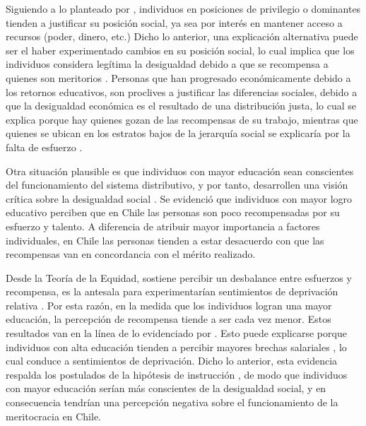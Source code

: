 \documentclass[12pt]{article}
\begin{document}
Siguiendo a lo planteado por \cite{Duru-bellat2012}, individuos en posiciones de privilegio o dominantes tienden a justificar su posición social, ya sea por interés en mantener acceso a recursos (poder, dinero, etc.) Dicho lo anterior, una explicación alternativa puede ser el haber experimentado cambios en su posición social, lo cual implica que los individuos considera legítima la desigualdad debido a que se recompensa a quienes son meritorios \citep{Day2017}. Personas que han progresado económicamente  debido  a los retornos educativos, son proclives a justificar las diferencias sociales, debido a que la desigualdad económica es el resultado de una distribución justa, lo cual se explica porque hay quienes gozan de las recompensas de su trabajo, mientras que quienes se ubican en los estratos bajos de la jerarquía social se explicaría por la falta de esfuerzo \citep{Schneider2015}. 

Otra situación plausible es que individuos con mayor educación sean conscientes del funcionamiento del sistema distributivo, y por tanto, desarrollen una visión crítica sobre la desigualdad social \citep{Duru-bellat2012}. Se evidenció que individuos con mayor logro educativo perciben que en Chile las personas son poco recompensadas por su esfuerzo y talento. A diferencia de atribuir mayor importancia a factores individuales, en Chile las personas tienden a estar desacuerdo con que las recompensas van en concordancia con el mérito realizado. 

Desde la Teoría de la Equidad, \citet{Adams1965} sostiene percibir un desbalance entre esfuerzos y recompensa, es la antesala para experimentarían sentimientos de deprivación relativa \citep{Merton1968}. Por esta razón, en la medida que los individuos logran una mayor educación, la percepción de recompensa tiende a ser cada vez menor. Estos resultados van en la línea de lo evidenciado por \cite{Castillo2018}. Esto puede explicarse porque individuos con alta educación tienden a percibir mayores brechas salariales \citep{Castillo2012}, lo cual conduce a sentimientos de deprivación. Dicho lo anterior, esta evidencia respalda los postulados de la hipótesis de instrucción \citep{Duru-bellat2012}, de modo que individuos con mayor educación serían más conscientes de la desigualdad social, y en consecuencia tendrían una percepción negativa sobre el funcionamiento de la meritocracia en Chile.  
\end{document}
